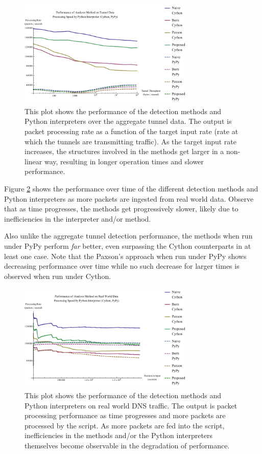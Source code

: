 \documentclass{llncs}
\begin{document}
\begin{figure}
\centering
\includegraphics[width=0.75\textwidth]{../figures/pmat.pdf}
\caption[Performance of Analysis Method and Python Interpreter on Aggregate
Tunnel Data]{This plot shows the performance of the detection methods and Python
interpreters over the aggregate tunnel data. The output is packet processing
rate as a function of the target input rate (rate at which the tunnels are
transmitting traffic). As the target input rate increases, the structures
involved in the methods get larger in a non-linear way, resulting in longer
operation times and slower performance.}
\label{pmat}
\end{figure}

Figure \ref{pmqr} shows the performance over time of the different detection
methods and Python interpreters as more packets are ingested from real world
data. Observe that as time progresses, the methods get progressively slower,
likely due to inefficiencies in the interpreter and/or method.

Also unlike the aggregate tunnel detection performance, the methods when run
under PyPy perform \emph{far} better, even surpassing the Cython counterparts in
at least one case. Note that the Paxson's approach when run under PyPy shows
decreasing performance over time while no such decrease for larger times is
observed when run under Cython.

\begin{figure}
\centering
\includegraphics[width=0.75\textwidth]{../figures/pmqr.pdf}
\caption[Performance of Analysis Method and Python Interpreter on Real World
Data]{This plot shows the performance of the detection methods and Python
interpreters on real world DNS traffic. The output is packet processing performance as time
progresses and more packets are processed by the script. As more packets are fed
into the script, inefficiencies in the methods and/or the Python interpreters
themselves become observable in the degradation of performance.}
\label{pmqr}
\end{figure}
\end{document}
